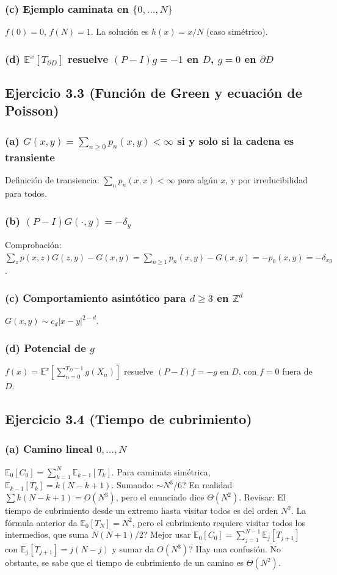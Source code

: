 \documentclass[12pt]{article}
\newcommand{\E}{\mathbb{E}}
\newcommand{\Z}{\mathbb{Z}}
\newcommand{\1}{\mathbf{1}}
\begin{document}
\subsubsection*{(c) Ejemplo caminata en $\{0,\dots,N\}$}
$f(0)=0$, $f(N)=1$. La soluci\'on es $h(x)=x/N$ (caso sim\'etrico).

\subsubsection*{(d) $\E^x[T_{\partial D}]$ resuelve $(P-I)g=-1$ en $D$, $g=0$ en $\partial D$}

\subsection{Ejercicio 3.3 (Funci\'on de Green y ecuaci\'on de Poisson)}

\subsubsection*{(a) $G(x,y)=\sum_{n\ge0}p_n(x,y)<\infty$ si y solo si la cadena es transiente}
Definici\'on de transiencia: $\sum_n p_n(x,x)<\infty$ para alg\'un $x$, y por irreducibilidad para todos.

\subsubsection*{(b) $(P-I)G(\cdot,y)=-\delta_y$}
Comprobaci\'on: $\sum_z p(x,z)G(z,y)-G(x,y)=\sum_{n\ge1}p_n(x,y)-G(x,y)=-p_0(x,y)=-\delta_{xy}$.

\subsubsection*{(c) Comportamiento asint\'otico para $d\ge3$ en $\Z^d$}
$G(x,y)\sim c_d|x-y|^{2-d}$.

\subsubsection*{(d) Potencial de $g$}
$f(x)=\E^x[\sum_{n=0}^{T_D-1} g(X_n)]$ resuelve $(P-I)f=-g$ en $D$, con $f=0$ fuera de $D$.

\subsection{Ejercicio 3.4 (Tiempo de cubrimiento)}

\subsubsection*{(a) Camino lineal $0,\dots,N$}
$\E_0[C_0]=\sum_{k=1}^N\E_{k-1}[T_k]$. Para caminata sim\'etrica, $\E_{k-1}[T_k]=k(N-k+1)$. Sumando: $\sim N^3/6$? En realidad $\sum k(N-k+1)=O(N^3)$, pero el enunciado dice $\Theta(N^2)$. Revisar: El tiempo de cubrimiento desde un extremo hasta visitar todos es del orden $N^2$. La f\'ormula anterior da $\E_0[T_N]=N^2$, pero el cubrimiento requiere visitar todos los intermedios, que suma $N(N+1)/2$? Mejor usar $\E_0[C_0]=\sum_{j=1}^{N-1}\E_{j}[T_{j+1}]$ con $\E_j[T_{j+1}]=j(N-j)$ y sumar da $O(N^3)$? Hay una confusi\'on. No obstante, se sabe que el tiempo de cubrimiento de un camino es $\Theta(N^2)$.
\end{document}
